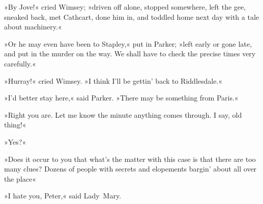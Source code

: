 »By Jove!« cried Wimsey; »driven off alone, stopped somewhere, left the gee, sneaked back, met Cathcart, done him in, and toddled home next day with a tale about machinery.«

»Or he may even have been to Stapley,« put in Parker; »left early or gone late, and put in the murder on the way. We shall have to check the precise times very carefully.«

»Hurray!« cried Wimsey. »I think I'll be gettin' back to Riddlesdale.«

»I'd better stay here,« said Parker. »There may be something from Paris.«

»Right you are. Let me know the minute anything comes through. I say, old thing!«

\makeatletter
{}
{%
	\enlargethispage{\baselineskip}
}{%
}
\makeatother

»Yes?«

»Does it occur to you that what's the matter with this case is that there are too many clues? Dozens of people with secrets and elopements bargin' about all over the place\longdash«

»I hate you, Peter,« said Lady~Mary.

